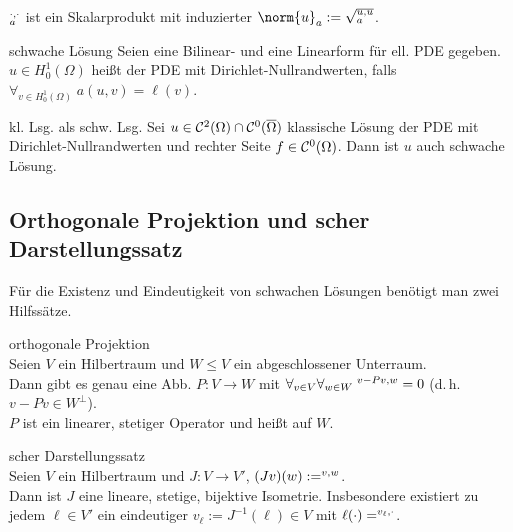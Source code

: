 \begin{Bem}
    $\sp{\cdot, \cdot}_a$ ist ein Skalarprodukt mit induzierter
     $\norm{u}_a := \sqrt{\sp{u, u}_a}$.
\end{Bem}

\linie

\begin{Def}{schwache Lösung}
    Seien eine Bilinear- und eine Linearform für ell. PDE gegeben.
    $u \in H^1_0(\Omega)$ heißt 
    der PDE mit Dirichlet-Nullrandwerten, falls $\forall_{v \in H^1_0(\Omega)}\; a(u,v) = \ell(v)$.
\end{Def}

\begin{Satz}{kl. Lsg. als schw. Lsg.}
    Sei $u \in \mathcal{C}^2(\Omega) \cap \mathcal{C}^0(\overline{\Omega})$ klassische Lösung der PDE mit
    Dirichlet-Nullrandwerten und rechter Seite $f \in \mathcal{C}^0(\Omega)$.
    Dann ist $u$ auch schwache Lösung.
\end{Satz}

\subsection{%
    Orthogonale Projektion und scher Darstellungssatz%
}

\begin{Bem}
    Für die Existenz und Eindeutigkeit von schwachen Lösungen benötigt man zwei Hilfssätze.
\end{Bem}

\begin{Satz}{orthogonale Projektion}\\
    Seien $V$ ein Hilbertraum und $W \le V$ ein abgeschlossener Unterraum.\\
    Dann gibt es genau eine Abb. $P\colon V \to W$ mit
    $\forall_{v \in V} \forall_{w \in W}\; \sp{v - Pv, w} = 0$
    (d.\,h. $v - Pv \in W^\bot$).\\
    $P$ ist ein linearer, stetiger Operator und heißt  auf $W$.
\end{Satz}

\begin{Satz}{scher Darstellungssatz}\\
    Seien $V$ ein Hilbertraum und $J\colon V \to V'$, $(Jv)(w) := \sp{v, w}$.\\
    Dann ist $J$ eine lineare, stetige, bijektive Isometrie.
    Insbesondere existiert zu jedem $\ell \in V'$ ein eindeutiger
     $v_\ell := J^{-1}(\ell) \in V$ mit
    $\ell(\cdot) = \sp{v_\ell, \cdot}$.
\end{Satz}

